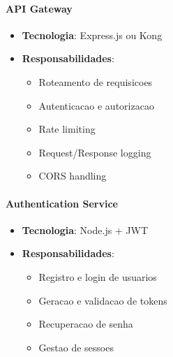 \paragraph{API Gateway}
\begin{itemize}
    \item \textbf{Tecnologia}: Express.js ou Kong
    \item \textbf{Responsabilidades}:
    \begin{itemize}
        \item Roteamento de requisicoes
        \item Autenticacao e autorizacao
        \item Rate limiting
        \item Request/Response logging
        \item CORS handling
    \end{itemize}
\end{itemize}

\paragraph{Authentication Service}
\begin{itemize}
    \item \textbf{Tecnologia}: Node.js + JWT
    \item \textbf{Responsabilidades}:
    \begin{itemize}
        \item Registro e login de usuarios
        \item Geracao e validacao de tokens
        \item Recuperacao de senha
        \item Gestao de sessoes
    \end{itemize}
\end{itemize}

